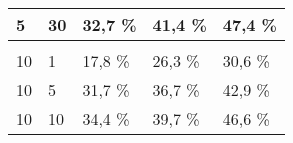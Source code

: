 \begin{table}[!htb]
\begin{tabular}{lllll}
\multicolumn{1}{|l|}{5}                                                      & \multicolumn{1}{l|}{30}                                                                & \multicolumn{1}{l|}{32,7 \%}                                                                                           & \multicolumn{1}{l|}{41,4 \%}                                                                                            & \multicolumn{1}{l|}{47,4 \%}                                                                                            \\ \hline
                                                                             &                                                                                        &                                                                                                                       &                                                                                                                        &                                                                                                                        \\ \hline
\multicolumn{1}{|l|}{10}                                                     & \multicolumn{1}{l|}{1}                                                                 & \multicolumn{1}{l|}{17,8 \%}                                                                                           & \multicolumn{1}{l|}{26,3 \%}                                                                                            & \multicolumn{1}{l|}{30,6 \%}                                                                                            \\ \hline
\multicolumn{1}{|l|}{10}                                                     & \multicolumn{1}{l|}{5}                                                                 & \multicolumn{1}{l|}{31,7 \%}                                                                                           & \multicolumn{1}{l|}{36,7 \%}                                                                                            & \multicolumn{1}{l|}{42,9 \%}                                                                                            \\ \hline
\multicolumn{1}{|l|}{10}                                                     & \multicolumn{1}{l|}{10}                                                                & \multicolumn{1}{l|}{34,4 \%}                                                                                           & \multicolumn{1}{l|}{39,7 \%}                                                                                            & \multicolumn{1}{l|}{46,6 \%}                                                                                            \\ \hline

\end{tabular}
\end{table}
